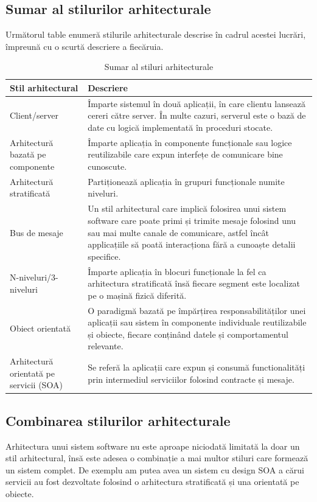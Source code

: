 \documentclass[12pt, a4paper, oneside, romanian]{teza-upb}
\begin{document}
\subsection{Sumar al stilurilor arhitecturale}
Următorul table enumeră stilurile arhitecturale descrise în cadrul acestei lucrări, împreună cu o scurtă descriere a fiecăruia.
\begin{table}[ht]
\centering
    \begin{tabular}{| p{3cm} | p{10cm} |}
    \hline  
    Stil arhitectural & Descriere \\ \hline
    	Client/server & 
    	Împarte sistemul în două aplicații, în care clientu lansează cereri către server. În multe cazuri, serverul este o bază de date cu logică implementată în proceduri stocate. \\ \hline
    Arhitectură bazată pe componente &
    Împarte aplicația în componente funcționale sau logice reutilizabile care expun interfețe de comunicare bine cunoscute. \\ \hline
	Arhitectură stratificată &
	Partiționează aplicația în grupuri funcționale numite niveluri. \\ \hline
	Bus de mesaje & 
	Un stil arhitectural care implică folosirea unui sistem software care poate primi și trimite mesaje folosind unu sau mai multe canale de comunicare, astfel încât applicațiile să poată interacționa fără a cunoaște detalii specifice. \\\hline
	N-niveluri/3-niveluri &
	Împarte	aplicația în blocuri funcționale la fel ca arhitectura stratificată însă fiecare segment este localizat pe o mașină fizică diferită.
	\\ \hline
	Obiect orientată &
	O paradigmă bazată pe împărțirea responsabilităților unei aplicații sau sistem în componente individuale reutilizabile și obiecte, fiecare conținând datele și comportamentul relevante. \\ \hline
	Arhitectură orientată pe servicii (SOA) &
 	Se referă la aplicații care expun și consumă functionalități prin intermediul serviciilor folosind contracte și mesaje. \\ \hline
    \end{tabular}
\caption{Sumar al stiluri arhitecturale}
\end{table}

\subsection{Combinarea stilurilor arhitecturale}
Arhitectura unui sistem software nu este aproape niciodată limitată la doar un stil arhitectural, însă este adesea o combinație a mai multor stiluri care formează un sistem complet. De exemplu am putea avea un sistem cu design SOA a cărui servicii au fost dezvoltate folosind o arhitectura stratificată și una orientată pe obiecte.
\end{document}
